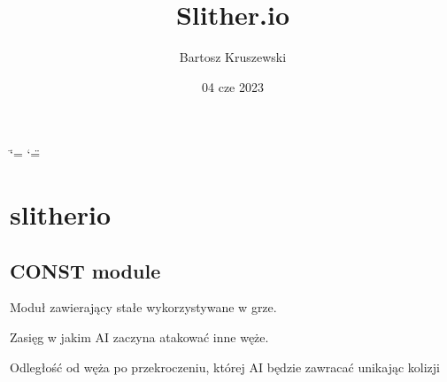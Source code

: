 \documentclass[letterpaper,10pt,polish]{sphinxmanual}
\title{Slither.io}
\date{04 cze 2023}
\author{Bartosz Kruszewski}
\begin{document}
\ifdefined\shorthandoff
  \ifnum\catcode`\=\string=\active\shorthandoff{=}\fi
  \ifnum\catcode`\"=\active{}\fi
\fi

\pagestyle{empty}
\sphinxmaketitle
\pagestyle{plain}
\sphinxtableofcontents
\pagestyle{normal}
\label{\detokenize{index::doc}}


\sphinxstepscope


\chapter{slitherio}
\label{\detokenize{modules:slitherio}}\label{\detokenize{modules::doc}}
\sphinxstepscope


\section{CONST module}
\label{\detokenize{const:module-const}}\label{\detokenize{const:const-module}}\label{\detokenize{const::doc}}
\sphinxAtStartPar
Moduł zawierający stałe wykorzystywane w grze.

\begin{fulllineitems}
\label{\detokenize{const:const.AI_ATTACK_FOCUS_DISTANCE}}
\pysigstartsignatures
{}
\pysigstopsignatures
\sphinxAtStartPar
Zasięg w jakim AI zaczyna atakować inne węże.

\end{fulllineitems}


\begin{fulllineitems}
\label{\detokenize{const:const.AI_SAFETY_DISTANCE}}
\pysigstartsignatures
{}
\pysigstopsignatures
\sphinxAtStartPar
Odległość od węża po przekroczeniu, której AI będzie zawracać unikając
kolizji

\end{fulllineitems}

\end{document}

